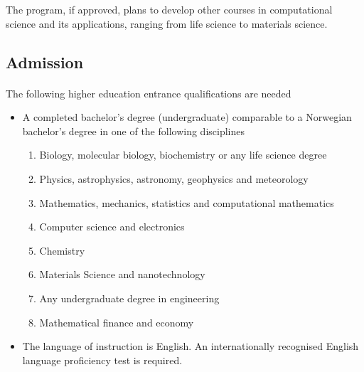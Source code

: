 \documentclass[%
twoside,                 %
final,                   %
10pt]{article}
\begin{document}
\noindent
The program, if approved, plans to develop other courses in computational science and its applications, ranging from life science to materials science.







\subsection*{Admission}

\paragraph{}
The following higher education entrance qualifications are needed
\begin{itemize}
\item A completed bachelor's degree (undergraduate) comparable to a Norwegian bachelor's degree in one of the following disciplines
\begin{enumerate}

 \item Biology, molecular biology, biochemistry  or any life science degree

 \item Physics, astrophysics, astronomy, geophysics and meteorology

 \item Mathematics, mechanics, statistics and computational mathematics

 \item Computer science and electronics

 \item Chemistry

 \item Materials Science and nanotechnology

 \item Any undergraduate degree in engineering

 \item Mathematical finance and economy

\end{enumerate}

\noindent
\item The language of instruction is English. An internationally recognised English language proficiency test is required.
\end{itemize}
\end{document}
